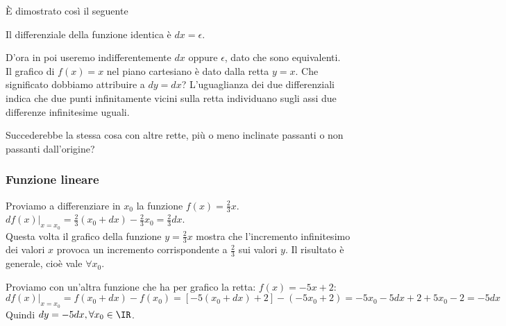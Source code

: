 \begin{inaccessibleblock}
 \begin{center}
 \begin{minipage}[]{.38 \textwidth}
  \rettabisettrice
 \end{minipage} 
 \hfill
 \begin{minipage}[]{.55 \textwidth}
È dimostrato così il seguente
\begin{teorema}
Il differenziale della funzione identica è $dx=\epsilon$.
\end{teorema}
D'ora in poi useremo indifferentemente $dx$ oppure $\epsilon$, dato che
sono equivalenti.\\
Il grafico di $f(x)=x$ nel piano cartesiano è dato dalla retta $y=x$. 
Che significato dobbiamo attribuire a $dy=dx$?
L'uguaglianza dei due differenziali indica che due punti infinitamente
vicini sulla retta individuano sugli assi due differenze infinitesime 
uguali.
 \end{minipage}
 \end{center}
\end{inaccessibleblock}
\label{fig:diff01_diffcostante}
  

Succederebbe la stessa cosa con altre rette, più o meno inclinate passanti o
non passanti dall'origine?

\subsubsection{Funzione lineare}
\label{subsubsec:diff01_flineare}

\begin{esempio}
 Proviamo a differenziare in $x_0$ la funzione $f(x)=\frac{2}{3}x$.\\
\( df(x)|_{x=x_0}=\frac{2}{3}(x_0+dx)-\frac{2}{3}x_0=\frac{2}{3}dx\).\\
Questa volta il grafico della funzione $y=\frac{2}{3}x$ mostra che
l'incremento infinitesimo dei valori $x$ provoca un incremento corrispondente 
a $\frac{2}{3}$ sui valori $y$. Il risultato è generale, 
cioè vale $\forall x_0$.
\end{esempio}

\begin{esempio}
Proviamo con un'altra funzione che ha per grafico la retta: \(f(x) = -5x+2\):
\[
df(x)|_{x=x_0} = 
f(x_0+dx)-f(x_0)=[-5(x_0+dx)+2]-(-5x_0+2)=-5x_0-5dx+2+5x_0-2=-5dx
\]
Quindi $dy=-5dx, \forall x_0 \in \IR$. 
\end{esempio}

